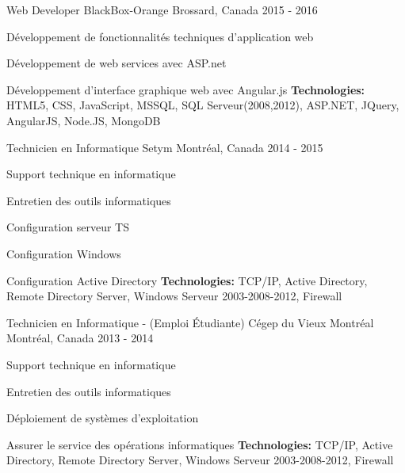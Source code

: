 \begin{cventries}
  \cventry
    {Web Developer}
    {BlackBox-Orange}
    {Brossard, Canada}
    {2015 - 2016}
    {
      \begin{cvitems}
        \item {Développement de fonctionnalités techniques d'application web}
        \item {Développement de web services avec ASP.net}
        \item {Développement d'interface graphique web avec Angular.js}
        \newline
        \vspace{3mm}
        \textbf{Technologies: }{ HTML5, CSS, JavaScript, MSSQL, SQL Serveur(2008,2012), ASP.NET, JQuery, AngularJS, Node.JS, MongoDB}
      \end{cvitems}
    }
  
  \cventry
    {Technicien en Informatique}
    {Setym}
    {Montréal, Canada}
    {2014 - 2015}
    {
      \begin{cvitems}
        \item {Support technique en informatique}
        \item {Entretien des outils informatiques}
        \item {Configuration serveur TS}
        \item {Configuration Windows}
        \item {Configuration Active Directory}
        \newline
        \vspace{3mm}
        \textbf{Technologies: }{TCP/IP, Active Directory, Remote Directory Server, Windows Serveur 2003-2008-2012, Firewall}
      \end{cvitems}
    }
    \vspace{3mm}
    
  \cventry
    {Technicien en Informatique - (Emploi Étudiante)}
    {Cégep du Vieux Montréal}
    {Montréal, Canada}
    {2013 - 2014}
    {
      \begin{cvitems}
        \item {Support technique en informatique}
        \item {Entretien des outils informatiques}
        \item {Déploiement de systèmes d’exploitation}
        \item {Assurer le service des opérations informatiques}
        \newline
        \vspace{3mm}
        \textbf{Technologies: }{TCP/IP, Active Directory, Remote Directory Server, Windows Serveur 2003-2008-2012, Firewall}
      \end{cvitems}
    }
\end{cventries}
\vspace{5mm}